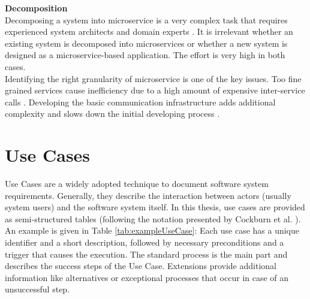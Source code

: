 \noindent
\textbf{Decomposition}\\
Decomposing a system into microservice is a very complex task that requires experienced system architects and domain experts \cite{Fowler}. It is irrelevant whether an existing system is decomposed into microservices or whether a new system is designed as a microservice-based application. The effort is very high in both cases.\\
Identifying the right granularity of microservice is one of the key issues. Too fine grained services cause inefficiency due to a high amount of expensive inter-service calls \cite{DomainEngineeringMunezero}. Developing the basic communication infrastructure adds additional complexity and slows down the initial developing process \cite{infoq}. \\



\section{Use Cases}
\label{sec:PrepApproach:UC}
Use Cases are a widely adopted technique to document software system requirements. Generally, they describe the interaction between actors (usually system users) and the software system itself. In this thesis, use cases are provided as semi-structured tables (following the notation presented by Cockburn et al. \cite{Cockburn}). \\ An example is given in Table \ref{tab:exampleUseCase}: Each use case has a unique identifier and a short description, followed by necessary preconditions and a trigger that causes the execution. The standard process is the main part and describes the success steps of the Use Case. Extensions provide additional information like alternatives or exceptional processes that occur in case of an unsuccessful step. 




